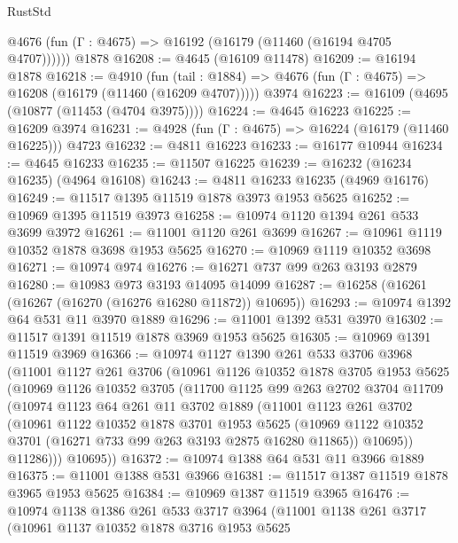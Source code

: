 \begin{lexlean}{RustStd}
\begin{coremodule}
      @4676 (fun (Γ : @4675) => @16192 (@16179 (@11460 (@16194 @4705 @4707))))))
    @1878
@16208 := @4645 (@16109 @11478)
@16209 := @16194 @1878
@16218 := @4910
    (fun (tail : @1884) => @4676 (fun (Γ : @4675) => @16208 (@16179 (@11460 (@16209 @4707)))))
    @3974
@16223 := @16109 (@4695 (@10877 (@11453 (@4704 @3975))))
@16224 := @4645 @16223
@16225 := @16209 @3974
@16231 := @4928 (fun (Γ : @4675) => @16224 (@16179 (@11460 @16225))) @4723
@16232 := @4811 @16223
@16233 := @16177 @10944
@16234 := @4645 @16233
@16235 := @11507 @16225
@16239 := @16232 (@16234 @16235) (@4964 @16108)
@16243 := @4811 @16233 @16235 (@4969 @16176)
@16249 := @11517 @1395 @11519 @1878 @3973 @1953 @5625
@16252 := @10969 @1395 @11519 @3973
@16258 := @10974 @1120 @1394 @261 @533 @3699 @3972
@16261 := @11001 @1120 @261 @3699
@16267 := @10961 @1119 @10352 @1878 @3698 @1953 @5625
@16270 := @10969 @1119 @10352 @3698
@16271 := @10974 @974
@16276 := @16271 @737 @99 @263 @3193 @2879
@16280 := @10983 @973 @3193 @14095 @14099
@16287 := @16258 (@16261 (@16267 (@16270 (@16276 @16280 @11872)) @10695))
@16293 := @10974 @1392 @64 @531 @11 @3970 @1889
@16296 := @11001 @1392 @531 @3970
@16302 := @11517 @1391 @11519 @1878 @3969 @1953 @5625
@16305 := @10969 @1391 @11519 @3969
@16366 := @10974
    @1127
    @1390
    @261
    @533
    @3706
    @3968
    (@11001
      @1127
      @261
      @3706
      (@10961
        @1126
        @10352
        @1878
        @3705
        @1953
        @5625
        (@10969
          @1126
          @10352
          @3705
          (@11700
            @1125
            @99
            @263
            @2702
            @3704
            @11709
            (@10974
              @1123
              @64
              @261
              @11
              @3702
              @1889
              (@11001
                @1123
                @261
                @3702
                (@10961
                  @1122
                  @10352
                  @1878
                  @3701
                  @1953
                  @5625
                  (@10969 @1122 @10352 @3701 (@16271 @733 @99 @263 @3193 @2875 @16280 @11865))
                  @10695))
              @11286)))
        @10695))
@16372 := @10974 @1388 @64 @531 @11 @3966 @1889
@16375 := @11001 @1388 @531 @3966
@16381 := @11517 @1387 @11519 @1878 @3965 @1953 @5625
@16384 := @10969 @1387 @11519 @3965
@16476 := @10974
    @1138
    @1386
    @261
    @533
    @3717
    @3964
    (@11001
      @1138
      @261
      @3717
      (@10961
        @1137
        @10352
        @1878
        @3716
        @1953
        @5625

\end{coremodule}
\end{lexlean}
